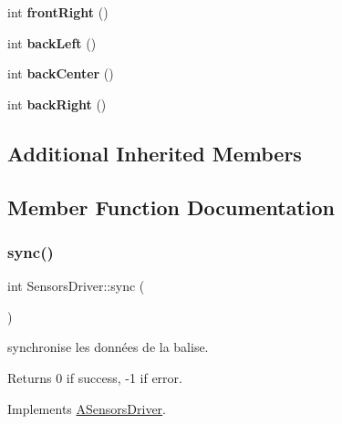 \begin{DoxyCompactItemize}
int {\bfseries front\+Right} ()
\item 
\mbox{\label{classSensorsDriver_ae0b9ea28342e6b59bbb2f9bfe187e839}} 
int {\bfseries back\+Left} ()
\item 
\mbox{\label{classSensorsDriver_ab2f96ed01fb916197ffb8906a6796c97}} 
int {\bfseries back\+Center} ()
\item 
\mbox{\label{classSensorsDriver_a4469035aacbc45c754dd3ae5e23275b3}} 
int {\bfseries back\+Right} ()
\end{DoxyCompactItemize}
\subsection*{Additional Inherited Members}


\subsection{Member Function Documentation}
\mbox{\label{classSensorsDriver_a1bfbcc82461257094ed185fa2017afad}} 
\subsubsection{\texorpdfstring{sync()}{sync()}\hspace{0.1cm}{\footnotesize\ttfamily [1/4]}}
{\footnotesize\ttfamily int Sensors\+Driver\+::sync (\begin{DoxyParamCaption}{ }\end{DoxyParamCaption})\hspace{0.3cm}{\ttfamily [virtual]}}



synchronise les données de la balise. 

\begin{DoxyReturn}{Returns}
0 if success, -\/1 if error. 
\end{DoxyReturn}


Implements \hyperlink{classASensorsDriver_a0c581029ba10d5ac820a9e3e2e6883cd}{A\+Sensors\+Driver}.

\mbox{\label{classSensorsDriver_a1bfbcc82461257094ed185fa2017afad}} 
